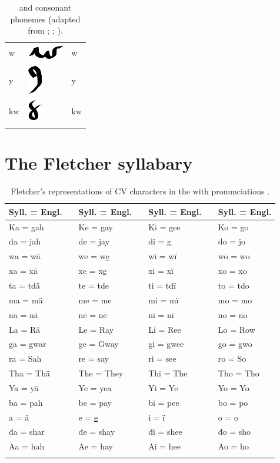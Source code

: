 \documentclass[output=paper]{LSP/langsci}
\begin{document}
\begin{table}
\begin{tabular}{lll}
w & \includegraphics{figures/Danker2w} & w\\
y & \includegraphics{figures/Danker2y} & y\\
kw & \includegraphics{figures/Danker2kw} & kw\\
\lspbottomrule
\end{tabular}
\caption{ and  consonant phonemes (adapted from \citealt{NatLangMeskSauk}; \citealt{Susman1939}; \citealt{Jones1906}).}
\label{mesquakiesaukconsonants}
\end{table}

				
\section{The Fletcher syllabary}

\begin{table}
\begin{tabular}{lllllll}
\lsptoprule
Syll. = Engl. && Syll. = Engl. && Syll. = Engl. && Syll. = Engl.\\
\midrule
Ka = gah && Ke = gay && Ki = gee && Ko = go\\
da = jah && de = jay && di = g && do = jo\\
wa = wä && we = w\underline{e} && wi = wï && wo = wo\\
xa = xä && xe = x\underline{e} && xi = xï && xo = xo\\
ta = tdä && te = tde && ti = tdï && to = tdo\\
ma = mä && me = me && mi = mï && mo = mo\\
na = nä && ne = ne && ni = nï && no = no\\
La = Rä && Le = Ray && Li = Ree && Lo = Row\\
ga = gwar && ge = Gway && gi = gwee && go = gwo\\
ra = Sah && re = say && ri = see && ro = So\\
Tha = Thä && The = They && Thi = The && Tho = Tho\\
Ya = yä && Ye = yea && Yi = Ye && Yo = Yo\\
ba = pah && be = pay && bi = pee && bo = po\\
a = ä && e = \underline{e} && i = ï && o = o\\
đa = shar && đe = shay && đi = shee && đo = sho\\
Aa = hah && Ae = hay && Ai = hee && Ao = ho\\
\lspbottomrule
\end{tabular}
\caption{Fletcher's representations of CV characters in the   with  pronunciations \citep[adapted from][300]{Fletcher1890a}.}
\label{fletchercv}
\end{table}
\end{document}
